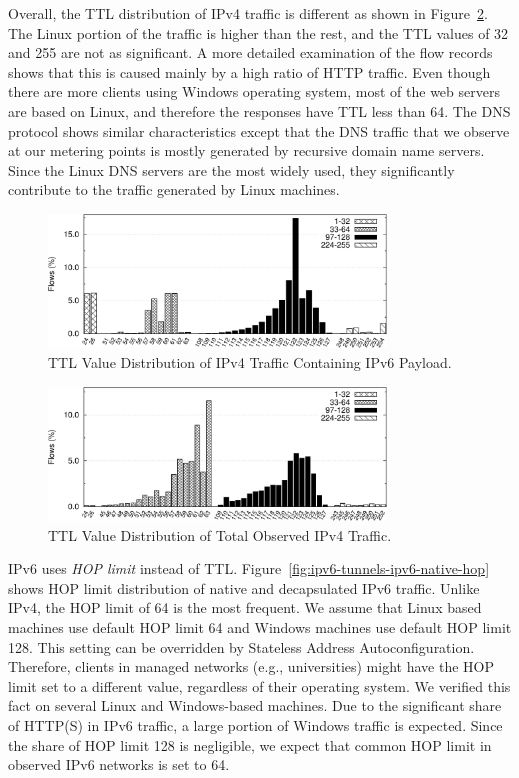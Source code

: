 Overall, the TTL distribution of IPv4 traffic is different as shown in Figure~\ref{fig:ipv6-tunnels-ipv4-ttl4}. The Linux portion of the traffic is higher than the rest, and the TTL values of 32 and 255 are not as significant. A more detailed examination of the flow records shows that this is caused mainly by a high ratio of HTTP traffic. Even though there are more clients using Windows operating system, most of the web servers are based on Linux, and therefore the responses have TTL less than 64. The DNS protocol shows similar characteristics except that the DNS traffic that we observe at our metering points is mostly generated by recursive domain name servers. Since the Linux DNS servers are the most widely used, they significantly contribute to the traffic generated by Linux machines.

\begin{figure}[!tb]
    \centering
    \includegraphics[width=0.8\textwidth]{figures/paper-tunnels/ttl/ttl}
    \caption{TTL Value Distribution of IPv4 Traffic Containing IPv6 Payload.}
    \label{fig:ipv6-tunnels-ipv4-ttl}
\end{figure}

\begin{figure}[!tb]
    \centering
    \includegraphics[width=0.8\textwidth]{figures/paper-tunnels/ttl/ttl4}
    \caption{TTL Value Distribution of Total Observed IPv4 Traffic.}
    \label{fig:ipv6-tunnels-ipv4-ttl4}
\end{figure}

IPv6 uses \textit{HOP limit} instead of TTL. Figure~\ref{fig:ipv6-tunnels-ipv6-native-hop} shows HOP limit distribution of native and decapsulated IPv6 traffic. Unlike IPv4, the HOP limit of 64 is the most frequent. We assume that Linux based machines use default HOP limit 64 and Windows machines use default HOP limit 128. This setting can be overridden by Stateless Address Autoconfiguration. Therefore, clients in managed networks (e.g., universities) might have the HOP limit set to a different value, regardless of their operating system. We verified this fact on several Linux and Windows-based machines. Due to the significant share of HTTP(S) in IPv6 traffic, a large portion of Windows traffic is expected. Since the share of HOP limit 128 is negligible, we expect that common HOP limit in observed IPv6 networks is set to 64.

